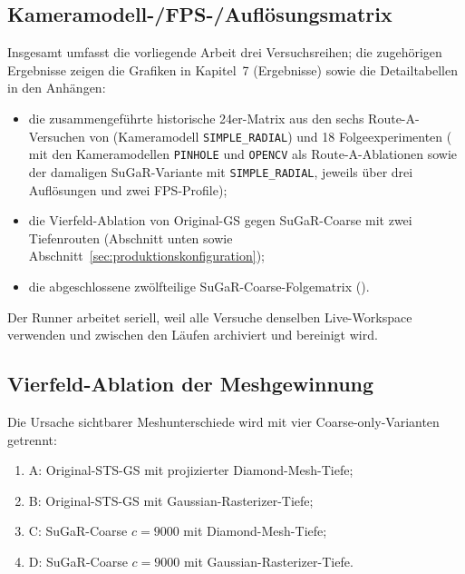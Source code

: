 \subsection{Kameramodell-/FPS-/Auflösungsmatrix}

Insgesamt umfasst die vorliegende Arbeit drei Versuchsreihen; die zugehörigen Ergebnisse
zeigen die Grafiken in Kapitel~7 (Ergebnisse) sowie die Detailtabellen in den
Anhängen:

\begin{itemize}
  \item die zusammengeführte historische 24er-Matrix aus den sechs
        Route-A-Versuchen von  (Kameramodell
        \texttt{SIMPLE\_RADIAL}) und 18
        Folgeexperimenten ( mit den Kameramodellen
        \texttt{PINHOLE} und \texttt{OPENCV} als Route-A-Ablationen sowie der
        damaligen SuGaR-Variante mit \texttt{SIMPLE\_RADIAL}, jeweils über
        drei Auflösungen und zwei FPS-Profile);
  \item die Vierfeld-Ablation von Original-GS gegen SuGaR-Coarse mit zwei
        Tiefenrouten (Abschnitt unten sowie
        Abschnitt~\ref{sec:produktionskonfiguration});
  \item die abgeschlossene zwölfteilige SuGaR-Coarse-Folgematrix
        ().
\end{itemize}

Der Runner arbeitet seriell, weil alle Versuche denselben
Live-Workspace verwenden und zwischen den Läufen archiviert und bereinigt
wird.

\subsection{Vierfeld-Ablation der Meshgewinnung}
\label{subsec:vierfeld-ablation}

Die Ursache sichtbarer Meshunterschiede wird mit vier Coarse-only-Varianten
getrennt:

\begin{enumerate}
  \item A: Original-STS-GS mit projizierter Diamond-Mesh-Tiefe;
  \item B: Original-STS-GS mit Gaussian-Rasterizer-Tiefe;
  \item C: SuGaR-Coarse $c=9000$ mit Diamond-Mesh-Tiefe;
  \item D: SuGaR-Coarse $c=9000$ mit Gaussian-Rasterizer-Tiefe.
\end{enumerate}

